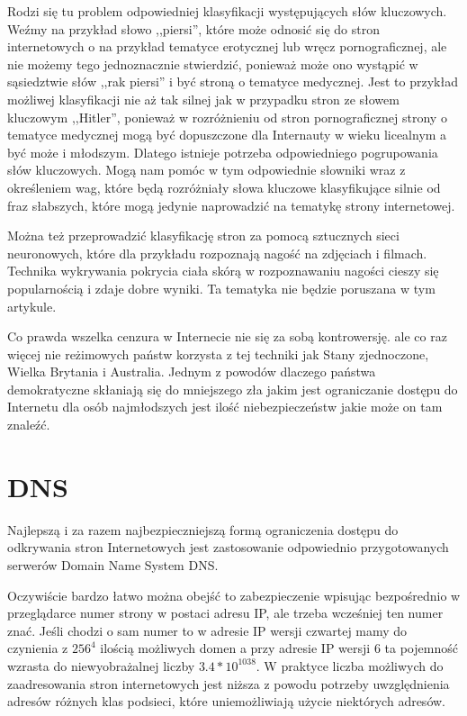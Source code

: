 \documentclass[9pt,twoside,a4paper]{article}
\begin{document}
Rodzi się tu problem odpowiedniej klasyfikacji występujących słów kluczowych. Weźmy na przykład słowo ,,piersi'', które może odnosić się do stron internetowych o na przykład tematyce erotycznej lub wręcz pornograficznej, ale nie możemy tego jednoznacznie stwierdzić, ponieważ może ono wystąpić w sąsiedztwie słów ,,rak piersi'' i być stroną o tematyce medycznej. Jest to przykład możliwej klasyfikacji nie aż tak silnej jak w przypadku stron ze słowem kluczowym ,,Hitler'', ponieważ w rozróżnieniu od stron pornograficznej strony o tematyce medycznej mogą być dopuszczone dla Internauty w wieku licealnym a być może i młodszym. Dlatego istnieje potrzeba odpowiedniego pogrupowania słów kluczowych. Mogą nam pomóc w tym odpowiednie słowniki wraz z określeniem wag, które będą rozróżniały słowa kluczowe klasyfikujące silnie od fraz słabszych, które mogą jedynie naprowadzić na tematykę strony internetowej.

Można też przeprowadzić klasyfikację stron za pomocą sztucznych sieci neuronowych, które dla przykładu rozpoznają nagość na zdjęciach i filmach\cite{will_archer_arentz_classifying_nodate, radhouane_guermazi_combining_2007, giuseppe_amato_detection_2009}. Technika wykrywania pokrycia ciała skórą w rozpoznawaniu nagości cieszy się popularnością i zdaje dobre wyniki\cite{mohammad_reza_mahmoodi_high_nodate}. Ta tematyka nie będzie poruszana w tym artykule.

Co prawda wszelka cenzura w Internecie nie się za sobą kontrowersję\cite{jonathan_zittrain_internet_2003}. ale co raz więcej nie reżimowych państw korzysta z tej techniki jak Stany zjednoczone, Wielka Brytania i Australia. Jednym z powodów dlaczego państwa demokratyczne skłaniają się do mniejszego zła jakim jest ograniczanie dostępu do Internetu dla osób najmłodszych jest ilość niebezpieczeństw jakie może on tam znaleźć\cite{piotr_luczuk_cyberwojna_2016}.

\section{DNS}
Najlepszą i za razem najbezpieczniejszą formą ograniczenia dostępu do odkrywania stron Internetowych jest zastosowanie odpowiednio przygotowanych serwerów Domain Name System DNS\cite{j._postel_domain_1984, p._mockapetris_domain_1987, p._mockapetris_domain2_1987, yakov_rekhter_dynamic_1997, r._elz_clarifications_1997}.

Oczywiście bardzo łatwo można obejść to zabezpieczenie wpisując  bezpośrednio w przeglądarce numer strony w postaci adresu IP, ale trzeba wcześniej ten numer znać. Jeśli chodzi o sam numer to w adresie IP wersji czwartej mamy do czynienia z  \({256}^{4}\) ilością możliwych domen a przy adresie IP wersji 6 ta pojemność wzrasta do niewyobrażalnej liczby \(3.4*10^{1038}\). W praktyce liczba możliwych do zaadresowania stron internetowych jest niższa z powodu potrzeby uwzględnienia adresów różnych klas podsieci, które uniemożliwiają użycie niektórych adresów.
\end{document}
